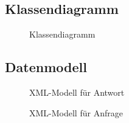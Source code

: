 
\clearpage

\subsection{Klassendiagramm}
\label{app:Klassendiagramm}
\begin{figure}[!htb]
\centering
{}
\caption{Klassendiagramm}
\end{figure}
\clearpage

\subsection{Datenmodell}
\label{app:Datenmodell}
\begin{figure}[h]
    \centering
    \caption{XML-Modell für Antwort}        
\end{figure}
\begin{figure}[!htb]
    \centering
    \caption{XML-Modell für Anfrage}
\end{figure}
\clearpage


\clearpage





% 
\clearpage


